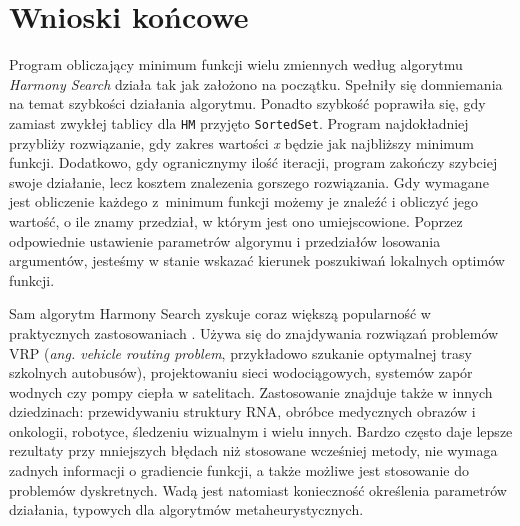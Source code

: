 \documentclass[10pt, a4paper]{article}
\begin{document}
\pagebreak

\section{Wnioski końcowe}
\label{sec:wnioski}
Program obliczający minimum funkcji wielu zmiennych według algorytmu {\em Harmony Search} działa tak jak założono na początku. Spełniły się domniemania na temat szybkości działania algorytmu. Ponadto szybkość poprawiła się, gdy zamiast zwykłej tablicy dla {\tt HM} przyjęto {\tt SortedSet}. Program najdokładniej przybliży rozwiązanie, gdy zakres wartości {\em x} będzie jak najbliższy minimum funkcji. Dodatkowo, gdy ogranicznymy ilość iteracji, program zakończy szybciej swoje działanie, lecz kosztem znalezenia gorszego rozwiązania. Gdy wymagane jest obliczenie każdego z~minimum funkcji możemy je znaleźć i obliczyć jego wartość, o ile znamy przedział, w którym jest ono umiejscowione. Poprzez odpowiednie ustawienie parametrów algorymu i przedziałów losowania argumentów, jesteśmy w stanie wskazać kierunek poszukiwań lokalnych optimów funkcji.

Sam algorytm Harmony Search zyskuje coraz większą popularność w praktycznych zastosowaniach \cite{bib:geempdf}. Używa się do znajdywania rozwiązań problemów VRP ({\em ang. vehicle routing problem}, przykładowo szukanie optymalnej trasy szkolnych autobusów), projektowaniu sieci wodociągowych, systemów zapór wodnych czy pompy ciepła w satelitach. Zastosowanie znajduje także w innych dziedzinach: przewidywaniu struktury RNA, obróbce medycznych obrazów i onkologii, robotyce, śledzeniu wizualnym i wielu innych. Bardzo często daje lepsze rezultaty przy mniejszych błędach niż stosowane wcześniej metody, nie wymaga zadnych informacji o gradiencie funkcji, a także możliwe jest stosowanie do problemów dyskretnych. Wadą jest natomiast konieczność określenia parametrów działania, typowych dla algorytmów metaheurystycznych.

\newpage
{}


\end{document}
